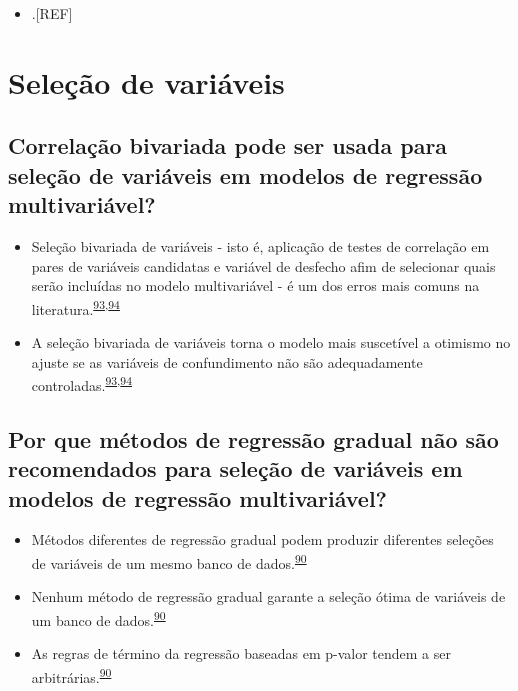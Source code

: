 \documentclass[
]{book}
\providecommand{\tightlist}{%
  \setlength{\itemsep}{0pt}\setlength{\parskip}{0pt}}
\begin{document}
\begin{itemize}
\tightlist
\item
  .{[}REF{]}
\end{itemize}

\hypertarget{selecao}{%
\section{Seleção de variáveis}\label{selecao}}

\hypertarget{correlauxe7uxe3o-bivariada-pode-ser-usada-para-seleuxe7uxe3o-de-variuxe1veis-em-modelos-de-regressuxe3o-multivariuxe1vel}{%
\subsection{Correlação bivariada pode ser usada para seleção de variáveis em modelos de regressão multivariável?}\label{correlauxe7uxe3o-bivariada-pode-ser-usada-para-seleuxe7uxe3o-de-variuxe1veis-em-modelos-de-regressuxe3o-multivariuxe1vel}}

\begin{itemize}
\item
  Seleção bivariada de variáveis - isto é, aplicação de testes de correlação em pares de variáveis candidatas e variável de desfecho afim de selecionar quais serão incluídas no modelo multivariável - é um dos erros mais comuns na literatura.\textsuperscript{\protect\hyperlink{ref-Dales1978}{93},\protect\hyperlink{ref-Sun1996}{94}}
\item
  A seleção bivariada de variáveis torna o modelo mais suscetível a otimismo no ajuste se as variáveis de confundimento não são adequadamente controladas.\textsuperscript{\protect\hyperlink{ref-Dales1978}{93},\protect\hyperlink{ref-Sun1996}{94}}
\end{itemize}

\hypertarget{por-que-muxe9todos-de-regressuxe3o-gradual-nuxe3o-suxe3o-recomendados-para-seleuxe7uxe3o-de-variuxe1veis-em-modelos-de-regressuxe3o-multivariuxe1vel}{%
\subsection{Por que métodos de regressão gradual não são recomendados para seleção de variáveis em modelos de regressão multivariável?}\label{por-que-muxe9todos-de-regressuxe3o-gradual-nuxe3o-suxe3o-recomendados-para-seleuxe7uxe3o-de-variuxe1veis-em-modelos-de-regressuxe3o-multivariuxe1vel}}

\begin{itemize}
\item
  Métodos diferentes de regressão gradual podem produzir diferentes seleções de variáveis de um mesmo banco de dados.\textsuperscript{\protect\hyperlink{ref-Healy1995}{90}}
\item
  Nenhum método de regressão gradual garante a seleção ótima de variáveis de um banco de dados.\textsuperscript{\protect\hyperlink{ref-Healy1995}{90}}
\item
  As regras de término da regressão baseadas em p-valor tendem a ser arbitrárias.\textsuperscript{\protect\hyperlink{ref-Healy1995}{90}}
\end{itemize}
\end{document}
